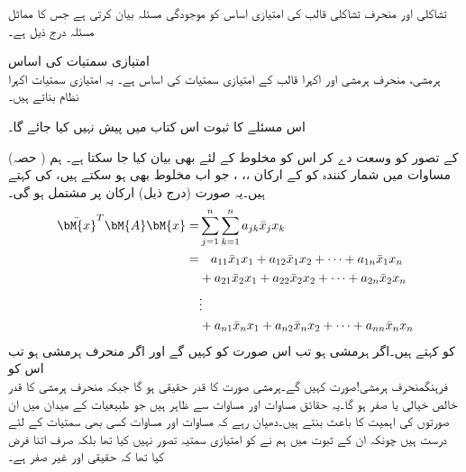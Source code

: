 تشاکلی اور منحرف تشاکلی قالب کی امتیازی اساس کو موجودگی مسئلہ   بیان کرتی ہے جس کا مماثل مسئلہ درج ذیل ہے۔

\quad امتیازی سمتیات کی اساس\\
ہرمشی، منحرف ہرمشی اور اکہرا قالب کے امتیازی سمتیات  کی اساس  ہے۔   یہ امتیازی سمتیات اکہرا نظام بناتے ہیں۔

اس مسئلے کا ثبوت اس کتاب میں پیش نہیں کیا جائے گا۔

 (حصہ ) کے تصور کو وسعت دے کر اس کو مخلوط کے لئے بھی بیان کیا جا سکتا ہے۔ ہم مساوات  میں شمار کنندہ 
 کو  کے ارکان ،، ، جو اب مخلوط بھی ہو سکتے ہیں، کی 
 کہتے ہیں۔یہ صورت (درج ذیل)  ارکان پر مشتمل ہو گی۔
\begin{gather}
\begin{aligned}\label{مساوات_امتیازی_ہرمشی_صورت_وغیرہ}
\bar{\bM{x}}^T\bM{A}\bM{x}=&\sum_{j=1}^{n}\sum_{k=1}^{n} a_{jk}\bar{x}_jx_k\\
=&\phantom{+\,}a_{11}\bar{x}_1x_1+a_{12}\bar{x}_1x_2+\cdots+a_{1n}\bar{x}_1x_n\\
&+a_{21}\bar{x}_2x_1+a_{22}\bar{x}_2x_2+\cdots+a_{2n}\bar{x}_2x_n\\
&\vdots\\
&+a_{n1}\bar{x}_n x_1+a_{n2}\bar{x}_n x_2+\cdots+a_{nn}\bar{x}_nx_n
\end{aligned}
\end{gather}
 کو  کہتے ہیں۔اگر  ہرمشی ہو تب اس صورت کو  کہیں گے اور اگر  منحرف ہرمشی ہو تب اس کو \\فرہنگ{منحرف ہرمشی!صورت} کہیں گے۔ہرمشی صورت کا قدر حقیقی ہو گا جبکہ منحرف ہرمشی کا قدر خالص خیالی یا صفر  ہو گا۔یہ حقائق مساوات  اور مساوات  سے ظاہر ہیں جو طبیعیات کے میدان میں ان صورتوں کی اہمیت کا باعث بنتے ہیں۔دھیان رہے کہ مساوات  اور مساوات  کسی بھی سمتیات کے لئے درست ہیں چونکہ ان کے ثبوت میں ہم نے  کو امتیازی سمتیہ تصور نہیں کیا تھا بلکہ صرف اتنا فرض کیا تھا کہ  حقیقی اور غیر صفر ہے۔

